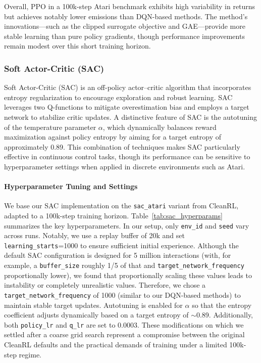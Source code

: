 Overall, PPO in a 100k-step Atari benchmark exhibits high variability in returns but achieves notably lower emissions than DQN-based methods. The method's innovations—such as the clipped surrogate objective and GAE—provide more stable learning than pure policy gradients, though performance improvements remain modest over this short training horizon.

\subsubsection{Soft Actor-Critic (SAC)}
\label{subsubsec:sac}

Soft Actor-Critic (SAC) is an off-policy actor–critic algorithm that incorporates entropy regularization to encourage exploration and robust learning. SAC leverages two Q-functions to mitigate overestimation bias and employs a target network to stabilize critic updates. A distinctive feature of SAC is the autotuning of the temperature parameter $\alpha$, which dynamically balances reward maximization against policy entropy by aiming for a target entropy of approximately 0.89. This combination of techniques makes SAC particularly effective in continuous control tasks, though its performance can be sensitive to hyperparameter settings when applied in discrete environments such as Atari.

\paragraph{Hyperparameter Tuning and Settings}
We base our SAC implementation on the \texttt{sac\_atari} variant from CleanRL, adapted to a 100k-step training horizon. Table~\ref{tab:sac_hyperparams} summarizes the key hyperparameters. In our setup, only \texttt{env\_id} and \texttt{seed} vary across runs. Notably, we use a replay buffer of 20k and set \texttt{learning\_starts}=1000 to ensure sufficient initial experience. Although the default SAC configuration is designed for 5 million interactions (with, for example, a \texttt{buffer\_size} roughly 1/5 of that and \verb*|target_network_frequency| proportionally lower), we found that proportionally scaling these values leads to instability or completely unrealistic values. Therefore, we chose a \verb*|target_network_frequency| of \num{1000} (similar to our DQN-based methods) to maintain stable target updates. Autotuning is enabled for $\alpha$ so that the entropy coefficient adjusts dynamically based on a target entropy of $\sim$\num{0.89}. Additionally, both \texttt{policy\_lr} and \texttt{q\_lr} are set to 0.0003. These modifications on which we settled after a coarse grid search represent a compromise between the original CleanRL defaults and the practical demands of training under a limited 100k-step regime.

